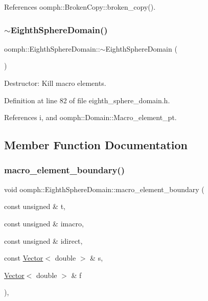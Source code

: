References oomph\+::\+Broken\+Copy\+::broken\+\_\+copy().

\mbox{\label{classoomph_1_1EighthSphereDomain_ab299e8bd818573e3fca246973f1030b2}} 
\subsubsection{\texorpdfstring{$\sim$\+Eighth\+Sphere\+Domain()}{~EighthSphereDomain()}}
{\footnotesize\ttfamily oomph\+::\+Eighth\+Sphere\+Domain\+::$\sim$\+Eighth\+Sphere\+Domain (\begin{DoxyParamCaption}{ }\end{DoxyParamCaption})\hspace{0.3cm}{\ttfamily [inline]}}



Destructor\+: Kill macro elements. 



Definition at line 82 of file eighth\+\_\+sphere\+\_\+domain.\+h.



References i, and oomph\+::\+Domain\+::\+Macro\+\_\+element\+\_\+pt.



\subsection{Member Function Documentation}
\mbox{\label{classoomph_1_1EighthSphereDomain_a281727105819669ea9dab9fec120ea63}} 
\subsubsection{\texorpdfstring{macro\+\_\+element\+\_\+boundary()}{macro\_element\_boundary()}}
{\footnotesize\ttfamily void oomph\+::\+Eighth\+Sphere\+Domain\+::macro\+\_\+element\+\_\+boundary (\begin{DoxyParamCaption}\item[{const unsigned \&}]{t,  }\item[{const unsigned \&}]{imacro,  }\item[{const unsigned \&}]{idirect,  }\item[{const \hyperlink{classoomph_1_1Vector}{Vector}$<$ double $>$ \&}]{s,  }\item[{\hyperlink{classoomph_1_1Vector}{Vector}$<$ double $>$ \&}]{f }\end{DoxyParamCaption})\hspace{0.3cm}{\ttfamily [inline]}, {\ttfamily [virtual]}}



